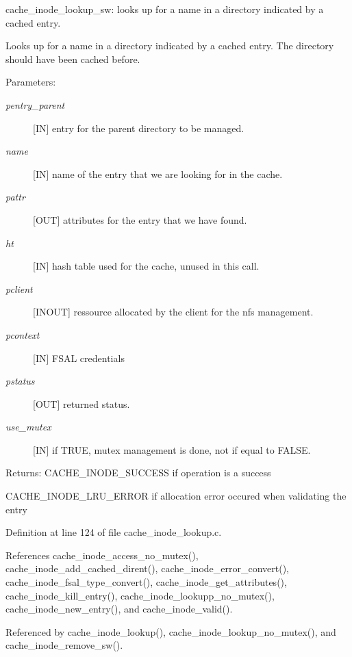 cache\_\-inode\_\-lookup\_\-sw: looks up for a name in a directory indicated by a cached entry.

Looks up for a name in a directory indicated by a cached entry. The directory should have been cached before.

\begin{Desc}
\item[Parameters:]
\begin{description}
\item[{\em pentry\_\-parent}][IN] entry for the parent directory to be managed. \item[{\em name}][IN] name of the entry that we are looking for in the cache. \item[{\em pattr}][OUT] attributes for the entry that we have found. \item[{\em ht}][IN] hash table used for the cache, unused in this call. \item[{\em pclient}][INOUT] ressource allocated by the client for the nfs management. \item[{\em pcontext}][IN] FSAL credentials \item[{\em pstatus}][OUT] returned status. \item[{\em use\_\-mutex}][IN] if TRUE, mutex management is done, not if equal to FALSE.\end{description}
\end{Desc}
\begin{Desc}
\item[Returns:]CACHE\_\-INODE\_\-SUCCESS if operation is a success \par
 

CACHE\_\-INODE\_\-LRU\_\-ERROR if allocation error occured when validating the entry \end{Desc}


Definition at line 124 of file cache\_\-inode\_\-lookup.c.

References cache\_\-inode\_\-access\_\-no\_\-mutex(), cache\_\-inode\_\-add\_\-cached\_\-dirent(), cache\_\-inode\_\-error\_\-convert(), cache\_\-inode\_\-fsal\_\-type\_\-convert(), cache\_\-inode\_\-get\_\-attributes(), cache\_\-inode\_\-kill\_\-entry(), cache\_\-inode\_\-lookupp\_\-no\_\-mutex(), cache\_\-inode\_\-new\_\-entry(), and cache\_\-inode\_\-valid().

Referenced by cache\_\-inode\_\-lookup(), cache\_\-inode\_\-lookup\_\-no\_\-mutex(), and cache\_\-inode\_\-remove\_\-sw().